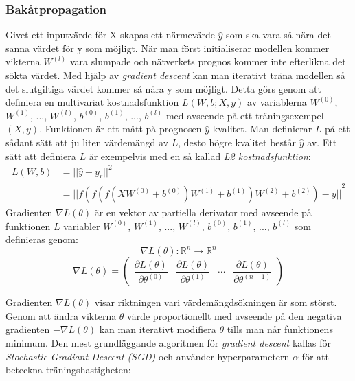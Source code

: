 \documentclass[a4paper,11pt,twoside]{article}
\newcommand*{\pd}[2]{\ensuremath{\dfrac{\partial #1}{\partial #2}}}
\begin{document}
\subsubsection{Bakåtpropagation}
Givet ett inputvärde för X skapas ett närmevärde $\hat{y}$ som ska vara så nära det sanna värdet för y som möjligt. När man först initialiserar modellen kommer vikterna $W^{(l)}$ vara slumpade och nätverkets prognos kommer inte efterlikna det sökta värdet. Med hjälp av \textit{gradient descent} kan man iterativt träna modellen så det slutgiltiga värdet kommer så nära y som möjligt. Detta görs genom att definiera en multivariat kostnadsfunktion $L(W, b; X,y)$ av variablerna $W^{(0)}$, $W^{(1)}$, ..., $W^{(l)}$, $b^{(0)}$, $b^{(1)}$, ..., $b^{(l)}$ med avseende på ett träningsexempel $(X, y)$. Funktionen är ett mått på prognosen $\hat{y}$ kvalitet. Man definierar $L$ på ett sådant sätt att ju liten värdemängd av $L$, desto högre kvalitet består $\hat{y}$ av. Ett sätt att definiera $L$ är exempelvis med en så kallad \textit{L2 kostnadsfunktion}: \cite{cs231n} \cite{wikiStanford}
\begin{equation}
\begin{split}
L(W,b) 	& = {||\hat{y}-y_r||}^2 \\
		& = {||f(f(f(XW^{(0)} +b^{(0)})W^{(1)} +b^{(1)})W^{(2)} +b^{(2)}) - y||}^2
\end{split}
\end{equation}
Gradienten $\nabla L(\theta)$ är en vektor av partiella derivator med avseende på funktionen $L$ variabler $W^{(0)}$, $W^{(1)}$, ..., $W^{(l)}$, $b^{(0)}$, $b^{(1)}$, ..., $b^{(l)}$ som definieras genom: \cite{gradient} \cite{convmath} 
\begin{equation}
\nabla L(\theta) : \mathbb{R}^n \to \mathbb{R}^n
\end{equation}
\begin{equation}
\nabla L(\theta) = 
	\begin{pmatrix} 
		\pd{L(\theta)}{\theta^{(0)}} & 
		\pd{L(\theta)}{\theta^{(1)}} &
		\cdots &
		\pd{L(\theta)}{\theta^{(n-1)}}
		
		\end{pmatrix}
\end{equation}

Gradienten $\nabla L(\theta)$ visar riktningen vari värdemängdsökningen är som störst. Genom att ändra vikterna $\theta$ värde proportionellt med avseende på den negativa gradienten $-\nabla L(\theta)$ kan man iterativt modifiera $\theta$ tills man når funktionens minimum. Den mest grundläggande algoritmen för \textit{gradient descent} kallas för \textit{Stochastic Gradiant Descent (SGD)} och använder hyperparametern $\alpha$ för att beteckna träningshastigheten: \cite{gradient} \cite{convmath} \cite{wikiStanford}
\end{document}
